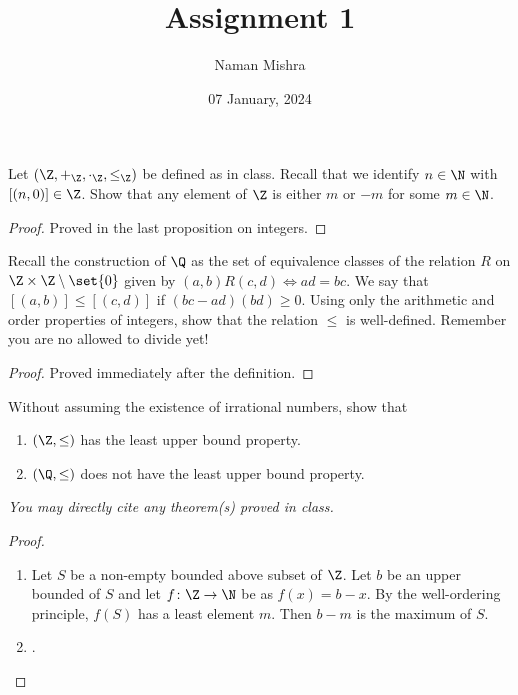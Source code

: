 \documentclass[12pt]{article}
\title{Assignment 1}
\author{Naman Mishra}
\date{07 January, 2024}
\begin{document}
\maketitle
\setcounter{assignment}{1}

\begin{problem*}
    Let $(\Z, +_\Z, \cdot_\Z, \le_\Z)$ be defined as in class.
    Recall that we identify $n \in \N$ with $[(n, 0)] \in \Z$.
    Show that any element of $\Z$ is either $m$ or $-m$ for some $m \in \N$.
\end{problem*}
\begin{proof}
    Proved in %
    {the last proposition on integers}.
\end{proof}

\begin{problem*}
    Recall the construction of $\Q$ as the set of equivalence classes
    of the relation $R$ on $\Z \times \Z \setminus \set{0}$ given by
    $(a, b) R (c, d) \iff ad = bc$.
    We say that $[(a, b)] \le [(c, d)]$ if $(bc - ad)(bd) \ge 0$.
    Using only the arithmetic and order properties of integers,
    show that the relation $\le$ is well-defined.
    Remember you are no allowed to divide yet!
\end{problem*}
\begin{proof}
    {Proved immediately after the definition}.
\end{proof}

\begin{problem*} \label{prb:ZQ:lub}
    Without assuming the existence of irrational numbers, show that
    \begin{enumerate}[label=(\alph*)]
        \item $(\Z, \le)$ has the least upper bound property.
        \item $(\Q, \le)$ does not have the least upper bound property.
    \end{enumerate}
    \textit{You may directly cite any theorem(s) proved in class.}
\end{problem*}
\begin{proof} \leavevmode
    \begin{enumerate}[label=(\alph*)]
        \item Let $S$ be a non-empty bounded above subset of $\Z$.
        Let $b$ be an upper bounded of $S$ and let
        $f \colon \Z \to \N$ be as $f(x) = b - x$.
        By the well-ordering principle, $f(S)$ has a least element $m$.
        Then $b - m$ is the maximum of $S$.
        \item {}. \qedhere
    \end{enumerate}
\end{proof}
\end{document}
